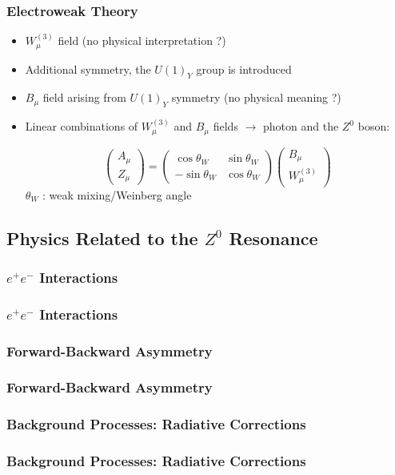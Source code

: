 \documentclass[10pt]{beamer}
\begin{document}
\begin{frame}
\frametitle{Electroweak Theory}
\begin{itemize}
\item $W^{(3)}_{\mu}$ field (no physical interpretation ?)
\item Additional symmetry, the $U(1)_{Y}$ group is introduced
\item $B_{\mu}$ field arising from $U(1)_{Y}$ symmetry (no physical meaning ?)
\item Linear combinations of $W^{(3)}_{\mu}$ and $B_{\mu}$ fields $\rightarrow$ photon and the $Z^{0}$ boson:

\begin{equation}
\begin{pmatrix} 
A_{\mu} \\ 
Z_{\mu} 
\end{pmatrix}
= 
\begin{pmatrix}
\cos \theta_{W} & \sin \theta_{W} \\
-\sin \theta_{W} & \cos \theta_{W} 
\end{pmatrix}
\begin{pmatrix}
B_{\mu} \\
W^{(3)}_{\mu}
\end{pmatrix}
\end{equation}
$\theta_{W}$ : weak mixing/Weinberg angle
\end{itemize}
\end{frame}
\subsection{Physics Related to the $Z^{0}$ Resonance}
\subsubsection{$e^{+}e^{-}$ Interactions}
\begin{frame}
\frametitle{$e^{+}e^{-}$ Interactions}
\end{frame}
\subsubsection{Forward-Backward Asymmetry}
\begin{frame}
\frametitle{Forward-Backward Asymmetry}
\end{frame}
\subsubsection{Background Processes: Radiative Corrections}
\begin{frame}
\frametitle{Background Processes: Radiative Corrections}
\end{frame}
\end{document}
